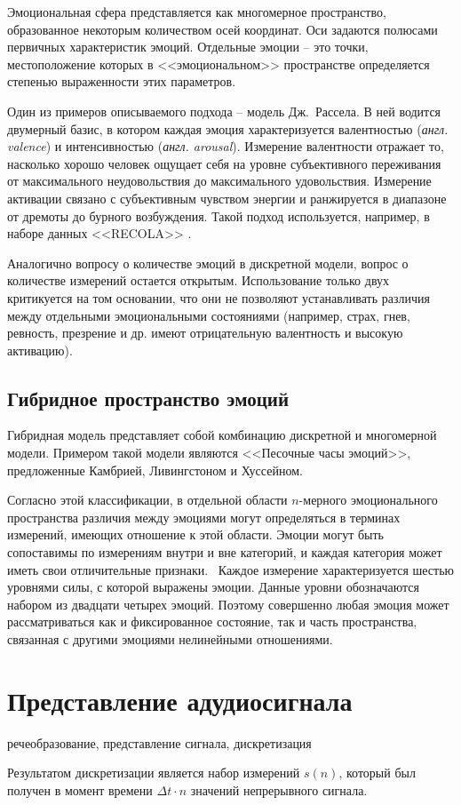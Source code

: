Эмоциональная сфера представляется как многомерное пространство, образованное некоторым
количеством осей координат. Оси задаются полюсами первичных характеристик эмоций. Отдельные эмоции -- это точки, местоположение которых в <<эмоциональном>> пространстве определяется степенью выраженности этих параметров.

Один из примеров описываемого подхода -- модель Дж.~Рассела. В ней водится двумерный базис, в котором каждая эмоция характеризуется валентностью (\textit{англ. valence}) и интенсивностью (\textit{англ. arousal}). Измерение валентности отражает то,
насколько хорошо человек ощущает себя на уровне субъективного переживания от максимального неудовольствия до максимального удовольствия. Измерение активации связано с
субъективным чувством энергии и ранжируется в диапазоне от дремоты до бурного возбуждения. Такой подход используется, например, в наборе данных <<RECOLA>> \cite{RECOLA}.

Аналогично вопросу о количестве эмоций в дискретной модели, вопрос о количестве измерений остается открытым. Использование только двух критикуется на том основании, что они не позволяют устанавливать различия между отдельными эмоциональными состояниями (например, страх, гнев, ревность, презрение и др. имеют отрицательную валентность и высокую активацию).

\subsection{Гибридное пространство эмоций}
Гибридная модель представляет собой комбинацию дискретной и многомерной модели. Примером такой модели являются <<Песочные часы эмоций>>, предложенные Камбрией, Ливингстоном и Хуссейном.~\cite{hourglass} 

Согласно этой классификации, в отдельной области $n$-мерного эмоционального пространства различия между эмоциями могут определяться в терминах измерений, имеющих отношение к этой области. Эмоции могут быть сопоставимы по измерениям внутри и вне категорий, и каждая категория может иметь свои отличительные признаки.~\cite{Russell2003} Каждое измерение характеризуется шестью уровнями силы, с которой выражены эмоции. Данные уровни обозначаются набором из двадцати четырех эмоций. Поэтому совершенно любая эмоция может рассматриваться как и фиксированное состояние, так и часть пространства, связанная с другими эмоциями нелинейными отношениями. 

\section{Представление адудиосигнала}
\begin{center}
	\color{red}речеобразование, представление сигнала, дискретизация
\end{center}
Результатом дискретизации является набор измерений $s(n)$, который был получен в момент времени $\Delta t \cdot n$ значений непрерывного сигнала.

